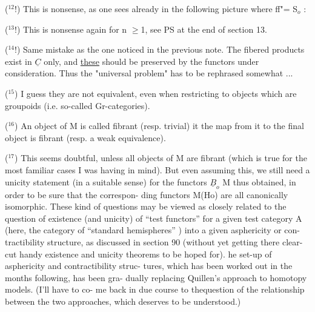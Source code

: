 
(${}^{12}$!)   This is nonsense, as one sees already in the following picture
where  f\hand{$\wedge$}f"= S$_{o}$ :  

(${}^{13}$!)   This is nonsense again for n $\geqslant$1,  see PS at the end of section 13.

(${}^{14}$!)   Same mistake as  the one noticed in the previous note.  The
fibered products exist in $\underline{C}$\hand{$_{\bullet}$} only,  and \uline{these} should be preserved by the
functors under consideration. Thus the "universal problem"  has to be
rephrased somewhat ...

(${}^{15}$)   I guess they are not equivalent,  even when restricting to objects
which are groupoids (i.e. so-called Gr-categories).

(${}^{16}$)  An object of M is called fibrant (resp. trivial) it the map from it
to the final object is fibrant (resp. a weak equivalence).

(${}^{17}$)   This seems doubtful,  unless all objects of M are fibrant (which is
true for the most familiar cases I was having in mind).  But even assuming
this,  we still need a unicity statement (in a suitable sense) for the
functors  $\underline{B}_{o}$\hand{$\to$} M  thus obtained,  in order to be sure that the correspon-%
ding functors  M\hand{$\to$}(Ho) are all canonically isomorphic.  These kind of
questions may be viewed as closely related to the question of existence
(and unicity) of ``test functors'' for a given test category A (here,  the
category of ``standard hemispheres'' \hand{\unsure{$\bigcirc$}}) into a given asphericity or con-%
tractibility structure,  as discussed in section 90 (without yet getting
there  clear-cut handy existence and unicity theorems  to
be  hoped for).  he set-up of asphericity and contractibility struc-%
tures,  which has been worked out in the months following,  has been gra-%
dually replacing Quillen's approach to homotopy models.  (I'll have to co-%
me back in due course to the\hand{/}question of the relationship between the two
approaches,  which deserves to be understood.)

